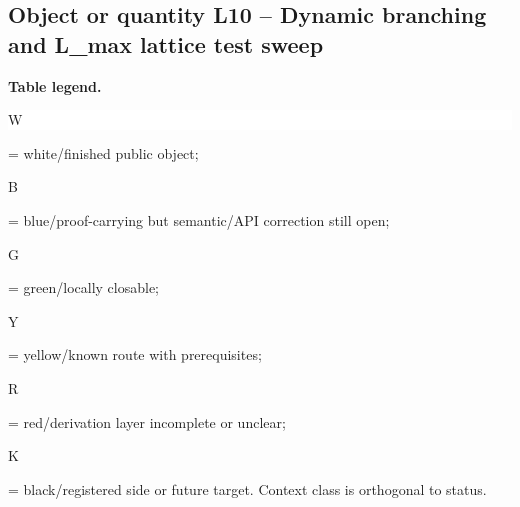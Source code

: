 \subsection*{Object or quantity L10 -- Dynamic branching and L\_max lattice test sweep}
\hypertarget{objproof:L10}{}
\par\smallskip\noindent\begin{minipage}{0.99\linewidth}\footnotesize\raggedright\textbf{Table legend.} \colorbox{white}{\strut W} = white/finished public object; \colorbox{cyan!20}{\strut B} = blue/proof-carrying but semantic/API correction still open; \colorbox{green!18}{\strut G} = green/locally closable; \colorbox{yellow!25}{\strut Y} = yellow/known route with prerequisites; \colorbox{red!20}{\strut R} = red/derivation layer incomplete or unclear; \colorbox{black!18}{\strut K} = black/registered side or future target. Context class is orthogonal to status.\end{minipage}\par\vspace{0.25em}
